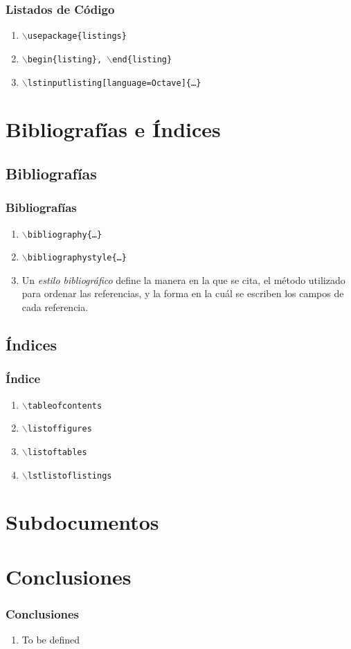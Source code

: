 \documentclass[a4paper,slidestop,xcolor=pst,dvips,blue]{beamer}
\newcommand{\command}[1]{\texttt{$\backslash$#1\{\dots\}}}
\newcommand{\singleCommand}[1]{\texttt{$\backslash$#1}}
\newcommand{\envCommand}[1]{\texttt{$\backslash$begin\{#1\}, $\backslash$end\{#1\}}}
\newcommand{\package}[1]{\texttt{$\backslash$usepackage\{#1\}}}
\begin{document}
\begin{frame}[c]
    \frametitle{Listados de Código}
    \begin{enumerate}[<+->]
        \item \package{listings}
        \item \envCommand{listing}
        \item \command{lstinputlisting[language=Octave]}
    \end{enumerate}
\end{frame}

\section{Bibliografías e Índices}

\subsection{Bibliografías}

\begin{frame}[c]
    \frametitle{Bibliografías}
    \begin{enumerate}[<+->]
        \item \command{bibliography}
        \item \command{bibliographystyle}
        \item Un \emph{estilo bibliográfico} define la manera en la que se cita, el método utilizado para ordenar las referencias, y la forma en la cuál se escriben los campos de cada referencia.
    \end{enumerate}
\end{frame}

\subsection{Índices}

\begin{frame}[c]
    \frametitle{Índice}
    \begin{enumerate}[<+->]
        \item \singleCommand{tableofcontents}
        \item \singleCommand{listoffigures}
        \item \singleCommand{listoftables}
        \item \singleCommand{lstlistoflistings}
    \end{enumerate}
\end{frame}

\section{Subdocumentos}

\section{Conclusiones}

\begin{frame}[c]
	\frametitle{Conclusiones}
	\begin{enumerate}[<+->]
		\item To be defined
	\end{enumerate}
\end{frame}

%    
%    
\end{document}
